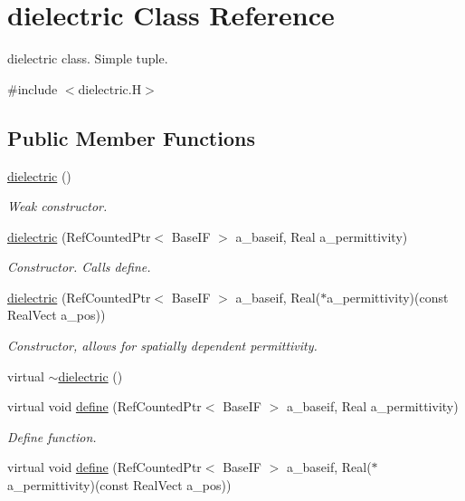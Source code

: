 \hypertarget{classdielectric}{}\section{dielectric Class Reference}
\label{classdielectric}


dielectric class. Simple tuple.  




{\ttfamily \#include $<$dielectric.\+H$>$}

\subsection*{Public Member Functions}
\begin{DoxyCompactItemize}
\item 
\hyperlink{classdielectric_af25a09c31bbbc8361f922fc8f375093d}{dielectric} ()
\begin{DoxyCompactList}\small\item\em Weak constructor. \end{DoxyCompactList}\item 
\hyperlink{classdielectric_ad89af9651fcf444ab987dbd4e0a5c903}{dielectric} (Ref\+Counted\+Ptr$<$ Base\+IF $>$ a\+\_\+baseif, Real a\+\_\+permittivity)
\begin{DoxyCompactList}\small\item\em Constructor. Calls define. \end{DoxyCompactList}\item 
\hyperlink{classdielectric_aa08f72845db134cf2c528cad2cb4521d}{dielectric} (Ref\+Counted\+Ptr$<$ Base\+IF $>$ a\+\_\+baseif, Real($\ast$a\+\_\+permittivity)(const Real\+Vect a\+\_\+pos))
\begin{DoxyCompactList}\small\item\em Constructor, allows for spatially dependent permittivity. \end{DoxyCompactList}\item 
virtual \hyperlink{classdielectric_aa62aa4ce1d097f80d36bb55bedbf4cd6}{$\sim$dielectric} ()
\item 
virtual void \hyperlink{classdielectric_a597943ba2632cf2cae5154ed325b62aa}{define} (Ref\+Counted\+Ptr$<$ Base\+IF $>$ a\+\_\+baseif, Real a\+\_\+permittivity)
\begin{DoxyCompactList}\small\item\em Define function. \end{DoxyCompactList}\item 
virtual void \hyperlink{classdielectric_af0a67e0632c71c2b59193a7d321e101d}{define} (Ref\+Counted\+Ptr$<$ Base\+IF $>$ a\+\_\+baseif, Real($\ast$a\+\_\+permittivity)(const Real\+Vect a\+\_\+pos))

\end{DoxyCompactItemize}
